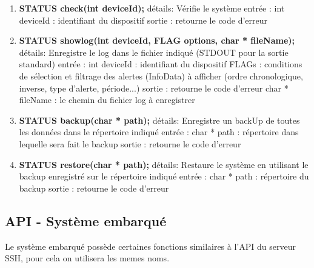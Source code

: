 \begin{enumerate}
\item \textbf{STATUS check(int deviceId);}
détails:
		Vérifie le système
entrée :
		int deviceId : identifiant du dispositif
sortie :
		retourne le code d'erreur

\item \textbf{STATUS showlog(int deviceId, FLAG options, char * fileName);}
détails:
		Enregistre le log dans le fichier indiqué (STDOUT pour la sortie standard)
entrée :
		int deviceId : identifiant du dispositif
		FLAGs : conditions de sélection et filtrage des alertes (InfoData) à afficher (ordre chronologique, inverse, type d'alerte, période...)
sortie :
		retourne le code d'erreur
		char * fileName : le chemin du fichier log à enregistrer

\item \textbf{STATUS backup(char * path);}
détails:
		Enregistre un backUp de toutes les données dans le répertoire indiqué
entrée :
		char * path : répertoire dans lequelle sera fait le backup
sortie :
		retourne le code d'erreur

\item \textbf{STATUS restore(char * path);}
détails:
		Restaure le système en utilisant le backup enregistré sur le répertoire indiqué
entrée :
		char * path : répertoire du backup
sortie :
		retourne le code d'erreur

\end{enumerate}


\subsection{API - Système embarqué}

Le système embarqué possède certaines fonctions similaires à l'API du serveur SSH, pour cela on utilisera les memes noms.


